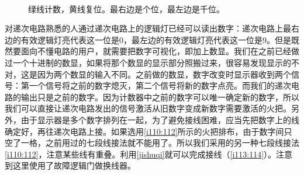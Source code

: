 \begin{figure}[!ht]
\begin{center}
\\
\end{center}
\caption{绿线计数，黄线复位。最右边是个位，最左边是千位。}
\label{i108:109}
\end{figure}

对递次电路熟悉的人通过递次电路上的逻辑灯已经可以读出数字：递次电路上最右边的有效逻辑灯亮代表这一位是0，最左边的有效逻辑灯亮代表这一位是9。但是既然要面向不懂电路的用户，就需要把数字可视化，即加上数显。我们在之前已经做过一个十进制的数显，如果将那个数显的显示部分照搬过来，很容易发现显示的不对，这是因为两个数显的输入不同。之前做的数显，数字改变时显示器收到两个信号：第一个信号将之前的数字熄灭，第二个信号将新的数字点亮。而我们的递次电路的输出只是之前的数字。因为计数器中之前的数字可以唯一确定新的数字，所以我们可以直接让递次电路发出的信号激活从旧数字变成新数字需要激活的火把。另外，由于显示器是多个数字排列在一起，为了避免接线困难，应当先把数字上的线确定好，再往递次电路上接。如果选用\autoref{i110:112}所示的火把排布，由于数字间只空了一格，之前用过的七段线接法就不能用了。所以我们采用的另一种七段线接法\autoref{i110:112}，注意某些线有重叠。利用\autoref{jishuqi}就可以完成接线（\autoref{i113:114}）。注意到这里使用了故障逻辑门做换线器。

\begin{figure}[!ht]
\begin{center}
\end{center}
\caption{}
\label{i110:112}
\end{figure}

